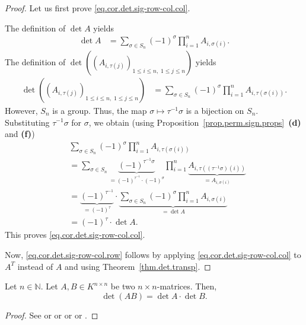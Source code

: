 \begin{proof}
\leanok
Let us first prove \eqref{eq.cor.det.sig-row-col.col}.

The definition of $\det A$ yields
\begin{align*}
  \det A
  &= \sum_{\sigma \in S_n} (-1)^{\sigma} \prod_{i=1}^{n} A_{i, \sigma(i)}.
\end{align*}
The definition of $\det\left( \left( A_{i, \tau(j)} \right)_{1 \leq i \leq n,\;
1 \leq j \leq n} \right)$ yields
\begin{align*}
  \det\left( \left( A_{i, \tau(j)} \right)_{1 \leq i \leq n,\; 1 \leq j \leq n} \right)
  &= \sum_{\sigma \in S_n} (-1)^{\sigma} \prod_{i=1}^{n} A_{i, \tau(\sigma(i))}.
\end{align*}
However, $S_n$ is a group. Thus, the map $\sigma \mapsto \tau^{-1} \sigma$
is a bijection on $S_n$. Substituting $\tau^{-1} \sigma$ for $\sigma$, we obtain
(using Proposition~\ref{prop.perm.sign.props}~\textbf{(d)} and \textbf{(f)})
\begin{align*}
  &\sum_{\sigma \in S_n} (-1)^{\sigma} \prod_{i=1}^{n} A_{i, \tau(\sigma(i))} \\
  &= \sum_{\sigma \in S_n}
     \underbrace{(-1)^{\tau^{-1} \sigma}}_{
       = (-1)^{\tau^{-1}} \cdot (-1)^{\sigma}}
     \prod_{i=1}^{n}
     \underbrace{A_{i, \tau((\tau^{-1} \sigma)(i))}}_{= A_{i, \sigma(i)}} \\
  &= \underbrace{(-1)^{\tau^{-1}}}_{= (-1)^{\tau}} \cdot
     \underbrace{\sum_{\sigma \in S_n} (-1)^{\sigma} \prod_{i=1}^{n} A_{i, \sigma(i)}}_{= \det A} \\
  &= (-1)^{\tau} \cdot \det A.
\end{align*}
This proves \eqref{eq.cor.det.sig-row-col.col}.

Now, \eqref{eq.cor.det.sig-row-col.row} follows by applying
\eqref{eq.cor.det.sig-row-col.col} to $A^T$ instead of $A$ and using
Theorem~\ref{thm.det.transp}.
\end{proof}

\begin{theorem}
\label{thm.det.detAB}
\leantarget
\leanok
Let $n \in \mathbb{N}$. Let $A, B \in K^{n \times n}$ be two $n \times n$-matrices.
Then,
\[
  \det(AB) = \det A \cdot \det B.
\]
\end{theorem}

\begin{proof}
\leanok
See \cite[Theorem B.17]{Strick13} or \cite[Theorem 6.23]{detnotes} or
\cite[\S 5]{Zeilbe} or \cite[Lemma 4.7.5 (1)]{Ford21} or
\cite[Theorem 5.7]{Laue-det}.
\end{proof}


